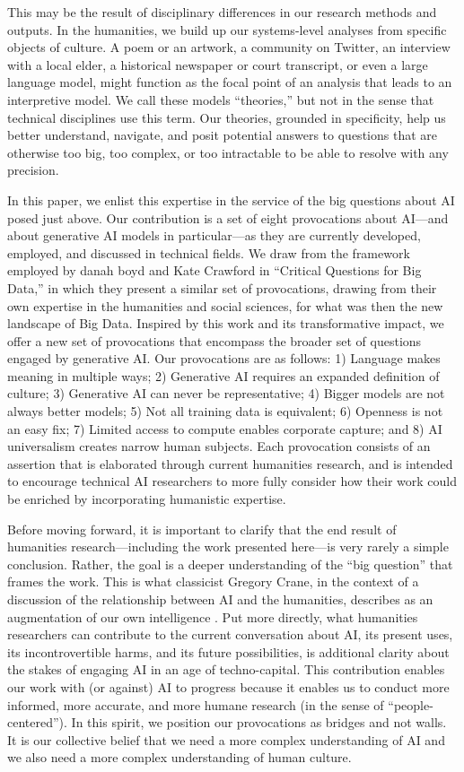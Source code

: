 This may be the result of disciplinary differences in our research methods and outputs. In the humanities, we build up our systems-level analyses from specific objects of culture. A poem or an artwork, a community on Twitter, an interview with a local elder, a historical newspaper or court transcript, or even a large language model, might function as the focal point of an analysis that leads to an interpretive model. We call these models ``theories,'' but not in the sense that technical disciplines use this term. Our theories, grounded in specificity, help us better understand, navigate, and posit potential answers to questions that are otherwise too big, too complex, or too intractable to be able to resolve with any precision. 

In this paper, we enlist this expertise in the service of the big questions about AI posed just above. Our contribution is a set of eight provocations about AI---and about generative AI models in particular---as they are currently developed, employed, and discussed in technical fields. We draw from the framework employed by danah boyd and Kate Crawford \citeyear{boyd_Crawford_2012} in ``Critical Questions for Big Data,'' in which they present a similar set of provocations, drawing from their own expertise in the humanities and social sciences, for what was then the new landscape of Big Data. Inspired by this work and its transformative impact, we offer a new set of provocations that encompass the broader set of questions engaged by generative AI. Our provocations are as follows: 1) Language makes meaning in multiple ways; 2) Generative AI requires an expanded definition of culture; 3) Generative AI can never be representative; 4) Bigger models are not always better models; 5) Not all training data is equivalent; 6) Openness is not an easy fix; 7) Limited access to compute enables corporate capture; and 8) AI universalism creates narrow human subjects. Each provocation consists of an assertion that is elaborated through current humanities research, and is intended to encourage technical AI researchers to more fully consider how their work could be enriched by incorporating humanistic expertise. 

Before moving forward, it is important to clarify that the end result of humanities research---including the work presented here---is very rarely a simple conclusion. Rather, the goal is a deeper understanding of the ``big question'' that frames the work. This is what classicist Gregory Crane, in the context of a discussion of the relationship between AI and the humanities, describes as an augmentation of our own intelligence \citeyear{Crane_2019}. Put more directly,  what humanities researchers can contribute to the current conversation about AI, its present uses, its incontrovertible harms, and its future possibilities, is additional clarity about the stakes of engaging AI in an age of techno-capital. This contribution enables our work with (or against) AI to progress because it enables us to conduct more informed, more accurate, and more humane research (in the sense of ``people-centered''). In this spirit, we position our provocations as bridges and not walls. It is our collective belief that we need a more complex understanding of AI and we also need a more complex understanding of human culture. 
